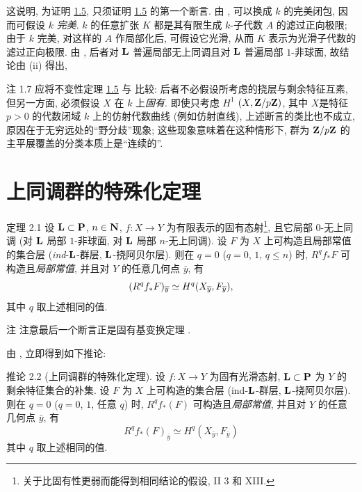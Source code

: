 这说明, 为证明 \hyperref[XVI.cor1.5]{1.5}, 只须证明 \hyperref[XVI.cor1.5]{1.5} 的第一个断言. 由 , 可以换成 $k$ 的完美闭包, 因而可假设 $k$ \emph{完美}. $k$ 的任意扩张 $K$ 都是其有限生成 $k$-子代数 $A$ 的滤过正向极限; 由于 $k$ 完美, 对这样的 $A$ 作局部化后, 可假设它光滑, 从而 $K$ 表示为光滑子代数的滤过正向极限. 由 , 后者对 $\mathbf{L}$ 普遍局部无上同调且对 $\mathbf{L}$ 普遍局部 $1$-非球面, 故结论由  (ii) 得出, \cqfd

\begin{enonce*}[remark]{注 1.7}
应将不变性定理 \hyperref[XVI.cor1.5]{1.5} 与  比较: 后者不必假设所考虑的挠层与剩余特征互素, 但另一方面, 必须假设 $X$ 在 $k$ 上\emph{固有}. 即使只考虑 $H^{1}$ $(X,\mathbf{Z}/p\mathbf{Z})$, 其中 $X$\pageoriginale 是特征 $p>0$ 的代数闭域 $k$ 上的仿射代数曲线 (例如仿射直线), 上述断言的类比也不成立, 原因在于无穷远处的“野分歧”现象; 这些现象意味着在这种情形下, 群为 $\mathbf{Z}/p\mathbf{Z}$ 的主平展覆盖的分类本质上是“连续的”.
\end{enonce*}

\section{上同调群的特殊化定理}

\begin{enonce*}{定理 2.1}
设 $\mathbf{L}\subset \mathbf{P}$, $n\in \mathbf{N}$, $f:X\rightarrow Y$ 为有限表示的固有态射\footnote[1]{关于比固有性更弱而能得到相同结论的假设, \cf {} II 3 和  XIII.}, 且它局部 $0$-无上同调 (\resp 对 $\mathbf{L}$ 局部 $1$-非球面, \resp 对 $\mathbf{L}$ 局部 $n$-无上同调). 设 $F$ 为 $X$ 上可构造且局部常值的集合层 (\resp \emph{ind}-$\mathbf{L}$-群层, \resp $\mathbf{L}$-挠阿贝尔层). 则在 $q=0$ (\resp $q=0$, $1$, \resp $q\leq n$) 时, $R^{q}f_{\ast}F$ 可构造且\emph{局部常值}, 并且对 $Y$ 的任意几何点 $\bar{y}$, 有
$$
(R^{q}f_{\ast}F)_{\overline{y}}\simeq
H^{q}(X_{\overline{y}},F_{\overline{y}}){},
$$
其中 $q$ 取上述相同的值.
\end{enonce*}

\begin{enonce*}[remark]{注}
注意最后一个断言正是固有基变换定理 .
\end{enonce*}

由 , 立即得到如下推论:\pageoriginale

\begin{enonce*}{推论 2.2}
(上同调群的特殊化定理). 设 $f:X\rightarrow Y$ 为固有光滑态射, $\mathbf{L}\subset \mathbf{P}$ 为 $Y$ 的剩余特征集合的补集. 设 $F$ 为 $X$ 上可构造的集合层 (\resp ind-$\mathbf{L}$-群层, \resp $\mathbf{L}$-挠阿贝尔层). 则在 $q=0$ (\resp $q=0$, $1$, \resp 任意 $q$) 时, $R^{q}f_{\ast}(F)$ 可构造且\emph{局部常值}, 并且对 $Y$ 的任意几何点 $\bar{y}$, 有
$$
R^{q}f_{\ast}(F)_{\bar{y}}\simeq H^{q}(X_{\bar{y}},F_{\bar{y}})
$$
其中 $q$ 取上述相同的值.
\end{enonce*}

